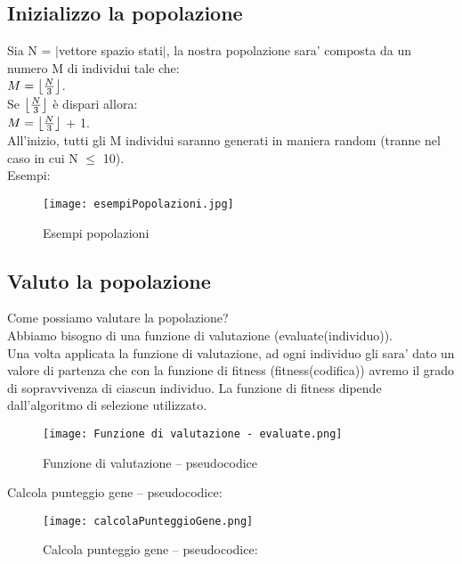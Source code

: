 \documentclass[10pt,a4paper]{article}
\begin{document}
    \subsection{Inizializzo la popolazione}
      \label{inizializzoLaPopolazioneSubsection}
      Sia N = $\lvert$vettore spazio stati$\rvert$, la nostra popolazione sara' composta da un numero M di individui tale che:\\ 
      $ M = \bigl\lfloor {N \over 3} \bigl\rfloor $.\\
      Se $\bigl\lfloor {N \over 3} \bigl\rfloor $ è dispari allora:\\ 
      $ M = \bigl\lfloor {N \over 3} \bigl\rfloor $ + 1.\\
      All'inizio, tutti gli M individui saranno generati in maniera random (tranne nel caso in cui N $\leq$ 10).\\
      Esempi:
      \begin{figure}
        \centering
        \caption{Esempi popolazioni}
        \texttt{[image: esempiPopolazioni.jpg]}
        \label{esempiPopolazioni}
      \end{figure}
      
      \newpage
      
  
    \subsection{Valuto la popolazione}
      \label{valutoLaPopolazioneSubsection}
      
      Come possiamo valutare la popolazione?\\
      Abbiamo bisogno di una funzione di valutazione (evaluate(individuo)).\\
      Una volta applicata la funzione di valutazione, ad ogni individuo gli sara' dato un valore di 
      partenza che con la funzione di fitness (fitness(codifica)) avremo il grado di sopravvivenza di ciascun 
      individuo. La funzione di fitness dipende dall'algoritmo di selezione utilizzato.\\
      
      \newpage
      \begin{figure}[h!]
        \centering
        \caption{Funzione di valutazione -- pseudocodice}
        \texttt{[image: Funzione di valutazione - evaluate.png]}
        \label{funzioneDiValutazionePseudocodice}
      \end{figure}
   
    \newpage
      Calcola punteggio gene -- pseudocodice:
       \begin{figure}[h!]
        \centering
        \caption{Calcola punteggio gene -- pseudocodice:}
        \texttt{[image: calcolaPunteggioGene.png]}
        \label{calcolaPunteggioGenePseudocodice}
      \end{figure}
      
\end{document}
